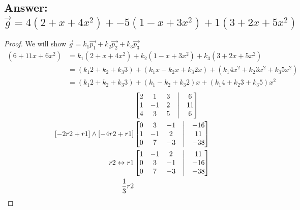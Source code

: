 \documentclass[12pt]{article}
\begin{document}
\subsection{Answer: $\vec{g} =  4(2 + x + 4x^2) +  -5(1 - x + 3x^2) +  1(3 + 2x + 5x^2)$}
\begin{proof} We will show $\vec{g} = k_{1}\vec{p_{1}} + k_{2}\vec{p_{2}} + k_{3}\vec{p_{3}}$
        \begin{align*}
                (6 + 11x + 6x^2) & =  k_{1}(2 + x + 4x^2) +  k_{2}(1 - x + 3x^2) +  k_{3}(3 + 2x + 5x^2)                                \\
                                 & =  (k_{1}2 + k_{2} + k_{3}3)  +  (k_{1}x - k_{2}x + k_{3}2x)  +  (k_{1}4x^2 + k_{2}3x^2 + k_{3}5x^2) \\
                                 & =  (k_{1}2 + k_{2} + k_{3}3)  +  (k_{1} - k_{2} + k_{3}2)x    +  (k_{1}4 + k_{2}3 + k_{3}5)x^2
        \end{align*}
        \begin{align*}
                 &
                \begin{bmatrix}
                        2 & 1  & 3 & \bigm| & 6  \\
                        1 & -1 & 2 & \bigm| & 11 \\
                        4 & 3  & 5 & \bigm| & 6  \\
                \end{bmatrix} \\
                [-2r2+r1] \wedge [-4r2+r1]
                 &
                \begin{bmatrix}
                        0 & 3  & -1 & \bigm| & -16 \\
                        1 & -1 & 2  & \bigm| & 11  \\
                        0 & 7  & -3 & \bigm| & -38 \\
                \end{bmatrix} \\
                r2\leftrightarrow r1
                 &
                \begin{bmatrix}
                        1 & -1 & 2  & \bigm| & 11  \\
                        0 & 3  & -1 & \bigm| & -16 \\
                        0 & 7  & -3 & \bigm| & -38 \\
                \end{bmatrix} \\
                \frac{1}{3}r2

\end{align*}
\end{proof}
\end{document}
